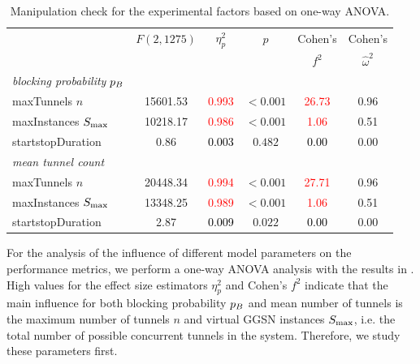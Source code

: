 \begin{table}\caption{Manipulation check for the experimental factors based on one-way ANOVA.}
\centering
\label{tab:cloud:virtualized_network_functions:performance_evaluation:virtual_ggsn:manipulation}
\tabcolsep=0.11cm
\begin{tabular}{lccccc}
\toprule
& \(F(2,1275)\) & \(\eta^2_p\) & \(p\) & Cohen's & Cohen's\\ 
&  & & & \(f^2\) & \(\hat{\omega}^2\) \\ 
\midrule
\emph{blocking probability} \(p_B\)  & & & & &\\ 
maxTunnels \(n\)&  15601.53 & \textcolor{red}{0.993} & $<0.001$ & \textcolor{red}{26.73} & 0.96\\ 
maxInstances \(S_{\max}\)&  10218.17 & \textcolor{red}{0.986} & $<0.001$ & \textcolor{red}{1.06} & 0.51\\ 
startstopDuration &  0.86 & \textcolor{black}{0.003} & $0.482$ & \textcolor{black}{0.00} & 0.00\\ 
\midrule
\emph{mean tunnel count}  & & & & &\\ 
maxTunnels \(n\)&  20448.34 & \textcolor{red}{0.994} & $<0.001$ & \textcolor{red}{27.71} & 0.96\\ 
maxInstances \(S_{\max}\)&  13348.25 & \textcolor{red}{0.989} & $<0.001$ & \textcolor{red}{1.06} & 0.51\\ 
startstopDuration &  2.87 & \textcolor{black}{0.009} & $0.022$ & \textcolor{black}{0.00} & 0.00\\ 
\bottomrule
\end{tabular}
\end{table}

For the analysis of the influence of different model parameters on the performance metrics, we perform a one-way ANOVA analysis with the results in .
High values for the effect size estimators \(\eta_p^2\) and Cohen's \(f^2\)\cite{Ellis2010} indicate that the main influence for both blocking probability \(p_B\) and mean number of tunnels is the maximum number of tunnels \(n\) and virtual \gls{GGSN} instances \(S_{\max}\), i.e. the total number of possible concurrent tunnels in the system.
Therefore, we study these parameters first.

